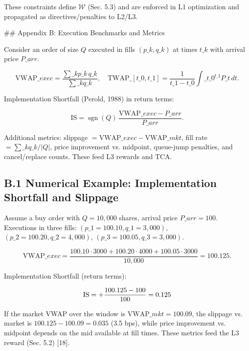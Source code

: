 \documentclass[11pt,a4paper]{article}
\begin{document}
These constraints define $\mathcal{W}$ (Sec. 5.3) and are enforced in L1 optimization and propagated as directives/penalties to L2/L3.

\#\# Appendix B: Execution Benchmarks and Metrics

Consider an order of size $Q$ executed in fills $(p\_k, q\_k)$ at times $t\_k$ with arrival price $P\_{arr}$.

\begin{equation}
\mathrm{VWAP}\_{exec} = \frac{\sum\_k p\_k\,q\_k}{\sum\_k q\_k},\quad \mathrm{TWAP}\_{[t\_0,t\_1]} = \frac{1}{t\_1-t\_0}\int\_{t\_0}^{t\_1} P\_t\,dt.
\end{equation}

Implementation Shortfall (Perold, 1988) in return terms:

\begin{equation}
\mathrm{IS} = \operatorname{sgn}(Q)\,\frac{\mathrm{VWAP}\_{exec}-P\_{arr}}{P\_{arr}}.
\end{equation}

Additional metrics: slippage $= \mathrm{VWAP}\_{exec}-\mathrm{VWAP}\_{mkt}$, fill rate $= \sum\_k q\_k/|Q|$, price improvement vs. midpoint, queue-jump penalties, and cancel/replace counts. These feed L3 rewards and TCA.

\subsection{B.1 Numerical Example: Implementation Shortfall and Slippage}

Assume a buy order with $Q=10,000$ shares, arrival price $P\_{arr}=100$. Executions in three fills: $(p\_1=100.10, q\_1=3,000)$, $(p\_2=100.20, q\_2=4,000)$, $(p\_3=100.05, q\_3=3,000)$.

\begin{equation}
\mathrm{VWAP}\_{exec} = \frac{100.10\cdot 3000 + 100.20\cdot 4000 + 100.05\cdot 3000}{10,000} = 100.125.
\end{equation}

Implementation Shortfall (return terms):

\begin{equation}
\mathrm{IS} = +\frac{100.125-100}{100} = 0.125\\%
\end{equation}

If the market VWAP over the window is $\mathrm{VWAP}\_{mkt}=100.09$, the slippage vs. market is $100.125-100.09=0.035$ (3.5 bps), while price improvement vs. midpoint depends on the mid available at fill times. These metrics feed the L3 reward (Sec. 5.2) [18].
\end{document}
